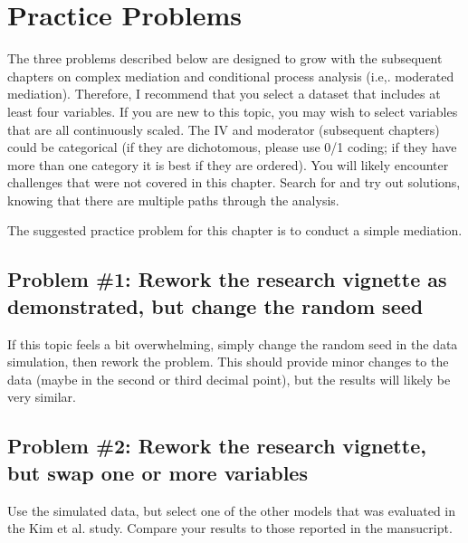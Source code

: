\documentclass[
  11pt,
]{book}
\begin{document}
\hypertarget{practice-problems-4}{%
\section{Practice Problems}\label{practice-problems-4}}

The three problems described below are designed to grow with the subsequent chapters on complex mediation and conditional process analysis (i.e,. moderated mediation). Therefore, I recommend that you select a dataset that includes at least four variables. If you are new to this topic, you may wish to select variables that are all continuously scaled. The IV and moderator (subsequent chapters) could be categorical (if they are dichotomous, please use 0/1 coding; if they have more than one category it is best if they are ordered). You will likely encounter challenges that were not covered in this chapter. Search for and try out solutions, knowing that there are multiple paths through the analysis.

The suggested practice problem for this chapter is to conduct a simple mediation.

\hypertarget{problem-1-rework-the-research-vignette-as-demonstrated-but-change-the-random-seed}{%
\subsection{Problem \#1: Rework the research vignette as demonstrated, but change the random seed}\label{problem-1-rework-the-research-vignette-as-demonstrated-but-change-the-random-seed}}

If this topic feels a bit overwhelming, simply change the random seed in the data simulation, then rework the problem. This should provide minor changes to the data (maybe in the second or third decimal point), but the results will likely be very similar.

\hypertarget{problem-2-rework-the-research-vignette-but-swap-one-or-more-variables}{%
\subsection{Problem \#2: Rework the research vignette, but swap one or more variables}\label{problem-2-rework-the-research-vignette-but-swap-one-or-more-variables}}

Use the simulated data, but select one of the other models that was evaluated in the Kim et al. \citeyearpar{kim_racial_2017} study. Compare your results to those reported in the mansucript.
\end{document}
